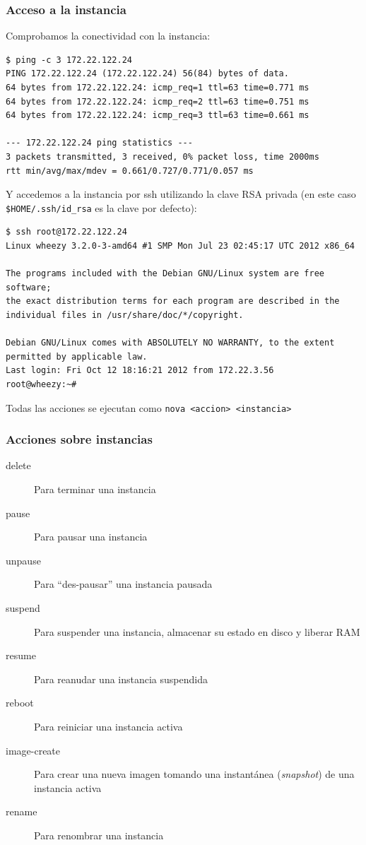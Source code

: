\documentclass{beamer}
\begin{document}
\begin{frame}[fragile]
  \frametitle{Acceso a la instancia}
  Comprobamos la conectividad con la instancia:
\begin{lstlisting}[style=consola]
$ ping -c 3 172.22.122.24
PING 172.22.122.24 (172.22.122.24) 56(84) bytes of data.
64 bytes from 172.22.122.24: icmp_req=1 ttl=63 time=0.771 ms
64 bytes from 172.22.122.24: icmp_req=2 ttl=63 time=0.751 ms
64 bytes from 172.22.122.24: icmp_req=3 ttl=63 time=0.661 ms

--- 172.22.122.24 ping statistics ---
3 packets transmitted, 3 received, 0% packet loss, time 2000ms
rtt min/avg/max/mdev = 0.661/0.727/0.771/0.057 ms
\end{lstlisting}
Y accedemos a la instancia por ssh utilizando la clave RSA privada (en este caso
\texttt{\$HOME/.ssh/id\_rsa} es la clave por defecto):
\begin{lstlisting}[style=consola]
$ ssh root@172.22.122.24
Linux wheezy 3.2.0-3-amd64 #1 SMP Mon Jul 23 02:45:17 UTC 2012 x86_64

The programs included with the Debian GNU/Linux system are free software;
the exact distribution terms for each program are described in the
individual files in /usr/share/doc/*/copyright.

Debian GNU/Linux comes with ABSOLUTELY NO WARRANTY, to the extent
permitted by applicable law.
Last login: Fri Oct 12 18:16:21 2012 from 172.22.3.56
root@wheezy:~# 
\end{lstlisting}
\end{frame}

\begin{frame}[fragile]
Todas las acciones se ejecutan como \texttt{nova <accion> <instancia>}
  \frametitle{Acciones sobre instancias}
  \begin{description}
  \item[delete] Para terminar una instancia
  \item[pause] Para pausar una instancia
  \item[unpause] Para ``des-pausar'' una instancia pausada
  \item[suspend] Para suspender una instancia, almacenar su estado en disco y
    liberar RAM
  \item[resume] Para reanudar una instancia suspendida
  \item[reboot] Para reiniciar una instancia activa
  \item[image-create] Para crear una nueva imagen tomando una instantánea
    (\textit{snapshot}) de una instancia activa
  \item[rename] Para renombrar una instancia
  \end{description}
\end{frame}
\end{document}
